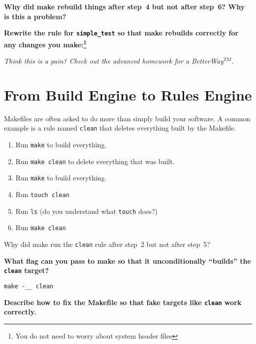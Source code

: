 \documentclass{article}
\begin{document}
\textbf{Why did make rebuild things after step~4 but not after step~6? Why is
this a problem?}
\vspace{2cm}

\textbf{Rewrite the rule for \texttt{simple\_test} so that make rebuilds
correctly for any changes you make:\footnote{You do not need to worry about
  system header files}}
\vspace{2cm}

\emph{\small Think this is a pain? Check out the advanced homework for a
  BetterWay$^{TM}$.}


\section{From Build Engine to Rules Engine}

Makefiles are often asked to do more than simply build your software. A common
example is a rule named \texttt{clean} that deletes everything built by the
Makefile.

\begin{enumerate}\small
  \item Run \texttt{make} to build everything.
  \item Run \texttt{make clean} to delete everything that was built.
  \item Run \texttt{make} to build everything.
  \item Run \texttt{touch clean}
  \item Run \texttt{ls} {(\footnotesize do you understand what \texttt{touch} does?)}
  \item Run \texttt{make clean}
\end{enumerate}

Why did make run the \texttt{clean} rule after step~2 but not after step~5?

\textbf{What flag can you pass to make so that it unconditionally ``builds''
  the \texttt{clean} target?}

\texttt{make -\_\_ clean}

\textbf{Describe how to fix the Makefile so that fake targets like \texttt{clean} work correctly.}
\vspace{2cm}
\end{document}
